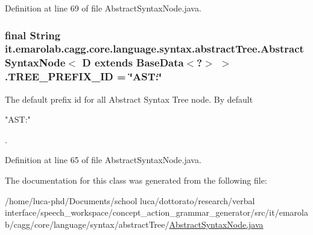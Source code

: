 Definition at line 69 of file Abstract\-Syntax\-Node.\-java.

\hypertarget{classit_1_1emarolab_1_1cagg_1_1core_1_1language_1_1syntax_1_1abstractTree_1_1AbstractSyntaxNode_366ce7377666ed8848a32408270165e9_a4190619b4a5741551b3cc5758af9219d}{
\subsubsection[{T\-R\-E\-E\-\_\-\-P\-R\-E\-F\-I\-X\-\_\-\-I\-D}]{\setlength{\rightskip}{0pt plus 5cm}final String it.\-emarolab.\-cagg.\-core.\-language.\-syntax.\-abstract\-Tree.\-Abstract\-Syntax\-Node$<$ D extends Base\-Data$<$?$>$ $>$.T\-R\-E\-E\-\_\-\-P\-R\-E\-F\-I\-X\-\_\-\-I\-D = \char`\"{}A\-S\-T\-:\char`\"{}\hspace{0.3cm}{\ttfamily [static]}}}\label{classit_1_1emarolab_1_1cagg_1_1core_1_1language_1_1syntax_1_1abstractTree_1_1AbstractSyntaxNode_366ce7377666ed8848a32408270165e9_a4190619b4a5741551b3cc5758af9219d}
The default prefix id for all Abstract Syntax Tree node. By default
\begin{DoxyCode}
\textcolor{stringliteral}{"AST:"} 
\end{DoxyCode}
 . 

Definition at line 65 of file Abstract\-Syntax\-Node.\-java.



The documentation for this class was generated from the following file\-:\begin{DoxyCompactItemize}
\item 
/home/luca-\/phd/\-Documents/school luca/dottorato/research/verbal interface/speech\-\_\-workspace/concept\-\_\-action\-\_\-grammar\-\_\-generator/src/it/emarolab/cagg/core/language/syntax/abstract\-Tree/\hyperlink{AbstractSyntaxNode_8java}{Abstract\-Syntax\-Node.\-java}\end{DoxyCompactItemize}
